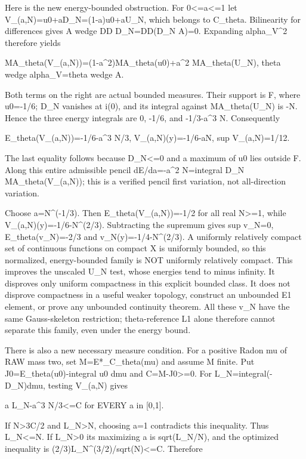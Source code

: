 \documentclass[11pt]{article}
\begin{document}
Here is the new energy-bounded obstruction. For 0<=a<=1 let V\_(a,N)=u0+aD\_N=(1-a)u0+aU\_N, which belongs to C\_theta. Bilinearity for differences gives A wedge DD D\_N=DD(D\_N A)=0. Expanding alpha\_V\textasciicircum{}2 therefore yields

MA\_theta(V\_(a,N))=(1-a\textasciicircum{}2)MA\_theta(u0)+a\textasciicircum{}2 MA\_theta(U\_N),
theta wedge alpha\_V=theta wedge A.

Both terms on the right are actual bounded measures. Their support is F, where u0=-1/6; D\_N vanishes at i(0), and its integral against MA\_theta(U\_N) is -N. Hence the three energy integrals are 0, -1/6, and -1/3-a\textasciicircum{}3 N. Consequently

E\_theta(V\_(a,N))=-1/6-a\textasciicircum{}3 N/3,
V\_(a,N)(y)=-1/6-aN,
sup V\_(a,N)=1/12.

The last equality follows because D\_N<=0 and a maximum of u0 lies outside F. Along this entire admissible pencil dE/da=-a\textasciicircum{}2 N=integral D\_N MA\_theta(V\_(a,N)); this is a verified pencil first variation, not all-direction variation.

Choose a=N\textasciicircum{}(-1/3). Then E\_theta(V\_(a,N))=-1/2 for all real N>=1, while V\_(a,N)(y)=-1/6-N\textasciicircum{}(2/3). Subtracting the supremum gives sup v\_N=0, E\_theta(v\_N)=-2/3 and v\_N(y)=-1/4-N\textasciicircum{}(2/3). A uniformly relatively compact set of continuous functions on compact X is uniformly bounded, so this normalized, energy-bounded family is NOT uniformly relatively compact. This improves the unscaled U\_N test, whose energies tend to minus infinity. It disproves only uniform compactness in this explicit bounded class. It does not disprove compactness in a useful weaker topology, construct an unbounded E1 element, or prove any unbounded continuity theorem. All these v\_N have the same Gauss-skeleton restriction; theta-reference L1 alone therefore cannot separate this family, even under the energy bound.

There is also a new necessary measure condition. For a positive Radon mu of RAW mass two, set M=E*\_C\_theta(mu) and assume M finite. Put J0=E\_theta(u0)-integral u0 dmu and C=M-J0>=0. For L\_N=integral(-D\_N)dmu, testing V\_(a,N) gives

a L\_N-a\textasciicircum{}3 N/3<=C for EVERY a in [0,1].

If N>3C/2 and L\_N>N, choosing a=1 contradicts this inequality. Thus L\_N<=N. If L\_N>0 its maximizing a is sqrt(L\_N/N), and the optimized inequality is (2/3)L\_N\textasciicircum{}(3/2)/sqrt(N)<=C. Therefore
\end{document}
